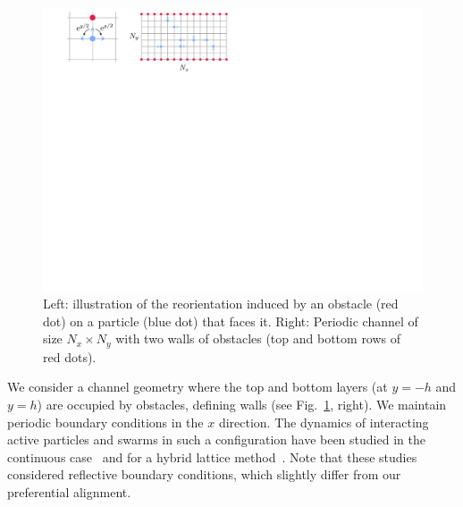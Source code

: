 \documentclass[aps,prl,twocolumn,amsmath,amssymb,superscriptaddress]{revtex4-1}
\begin{document}
\begin{figure}[h]
    \centering
    \includegraphics[width=.8\columnwidth]{sketch_lattice_channel.pdf}
    \caption{\label{fig:sketch_lattice_channel}Left: illustration of the reorientation induced by an obstacle (red dot) on a particle (blue dot) that faces it. Right: Periodic channel of size $N_x\times N_y$ with two walls of obstacles (top and bottom rows of red dots).}
\end{figure}

We consider a channel geometry where the top and bottom layers (at $y=-h$ and $y=h$) are occupied by obstacles, defining walls (see Fig.~\ref{fig:sketch_lattice_channel}, right). We maintain periodic boundary conditions in the $x$ direction. The dynamics of interacting active particles and swarms in such a configuration have been studied in the continuous case~\cite{armbruster2017swarming} and for a hybrid lattice method~\cite{kuhn2021lattice}. Note that these studies considered reflective boundary conditions, which slightly differ from our preferential alignment.
\end{document}
